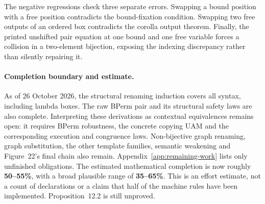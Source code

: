 
The negative regressions check three separate errors. Swapping a bound
position with a free position contradicts the bound-fixation condition. Swapping
two free outputs of an ordered box contradicts the corolla output theorem.
Finally, the printed unshifted pair equation at one bound and one free variable
forces a collision in a two-element bijection, exposing the indexing discrepancy
rather than silently repairing it.




\paragraph{Completion boundary and estimate.}
As of 26 October 2026, the structural renaming induction covers all syntax,
including lambda boxes. The raw BPerm pair and its structural safety laws are
also complete. Interpreting these derivations as contextual equivalences remains
open: it requires BPerm robustness, the concrete copying UAM and the corresponding
execution and congruence laws. Non-bijective graph renaming, graph substitution,
the other template families, semantic weakening and Figure~22's final chain also
remain. Appendix~\ref{app:remaining-work} lists only unfinished obligations.
The estimated mathematical completion is now roughly \textbf{50--55\%}, with a
broad plausible range of \textbf{35--65\%}. This is an effort estimate, not a count
of declarations or a claim that half of the machine rules have been implemented.
Proposition~12.2 is still unproved.

